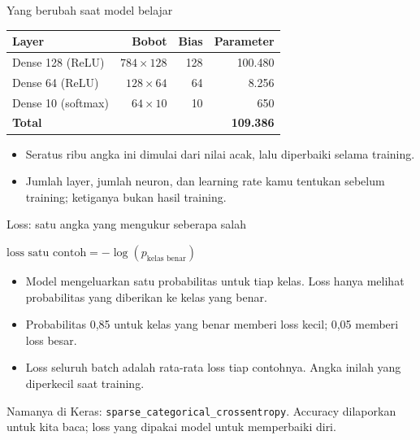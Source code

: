\documentclass[aspectratio=169,t]{beamer}
\begin{document}
\begin{frame}{Yang berubah saat model belajar}
  \vspace{0.6em}
  \begin{center}
  {\small\renewcommand{\arraystretch}{1.3}
  \begin{tabular}{lrrr}
    \toprule
    \rowcolor{nvcard}\color{nvgreen}\textbf{Layer} &
    \color{nvgreen}\textbf{Bobot} &
    \color{nvgreen}\textbf{Bias} &
    \color{nvgreen}\textbf{Parameter} \\
    \midrule
    Dense 128 (ReLU)    & $784\times128$ & 128 & 100.480 \\
    Dense 64 (ReLU)     & $128\times64$  & 64  & 8.256 \\
    Dense 10 (softmax)  & $64\times10$   & 10  & 650 \\
    \midrule
    \textbf{Total}      &                &     & \textbf{109.386} \\
    \bottomrule
  \end{tabular}}
  \end{center}
  \vspace{0.7em}
  \begin{itemize}\setlength\itemsep{0.3em}
    \item Seratus ribu angka ini dimulai dari nilai acak, lalu diperbaiki selama training.
    \item Jumlah layer, jumlah neuron, dan learning rate kamu tentukan sebelum training;
          ketiganya bukan hasil training.
  \end{itemize}
\end{frame}

\begin{frame}{Loss: satu angka yang mengukur seberapa salah}
  \vspace{0.5em}
  \begin{center}
    \color{nvlightgreen}$\displaystyle \text{loss satu contoh} = -\log\left(p_{\text{kelas benar}}\right)$
  \end{center}
  \vspace{0.5em}
  \begin{itemize}\setlength\itemsep{0.42em}
    \item Model mengeluarkan satu probabilitas untuk tiap kelas. Loss hanya melihat
          probabilitas yang diberikan ke kelas yang benar.
    \item Probabilitas 0,85 untuk kelas yang benar memberi loss kecil; 0,05 memberi loss besar.
    \item Loss seluruh batch adalah rata-rata loss tiap contohnya. Angka inilah yang
          diperkecil saat training.
  \end{itemize}
  \vspace{0.5em}
  {\footnotesize\color{nvgray}Namanya di Keras: \texttt{sparse\_categorical\_crossentropy}.
  Accuracy dilaporkan untuk kita baca; loss yang dipakai model untuk memperbaiki diri.}
\end{frame}
\end{document}
